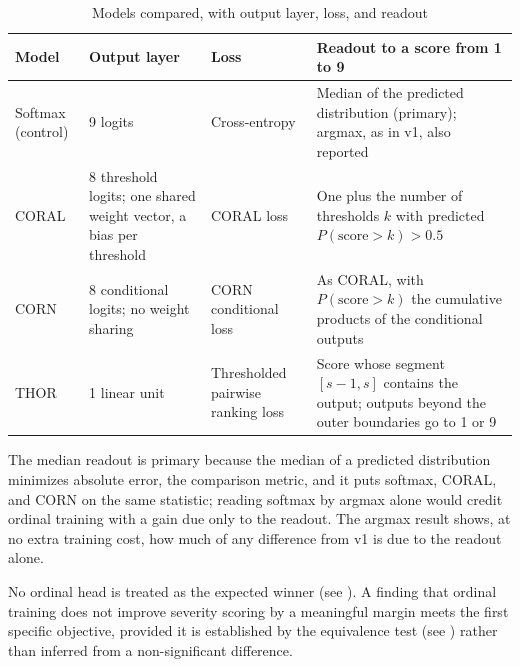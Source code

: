 \documentclass{icsthesis}
\newcommand{\secref}[1]{\textit{\nameref{#1}}}
\begin{document}
\begin{mainmatter}
					\begin{table}[htbp]
					\vspace{4ex}
					\centering
						\caption{Models compared, with output layer, loss, and readout}
						\label{tab:models}
						\singlespacing\footnotesize
						\begin{tabular}{p{2.3cm}p{3.6cm}p{3.1cm}p{4.5cm}}
						\hline
						\hline
						Model & Output layer & Loss & Readout to a score from 1 to 9 \\ \hline
						Softmax (control) & 9 logits & Cross-entropy & Median of the predicted distribution (primary);
						argmax, as in v1, also reported \\
						CORAL \citep{cao2020} & 8 threshold logits; one shared weight vector, a bias per threshold &
						CORAL loss & One plus the number of thresholds $k$ with predicted $P(\text{score} > k) > 0.5$ \\
						CORN \citep{shi2023corn} & 8 conditional logits; no weight sharing & CORN conditional loss & As
						CORAL, with $P(\text{score} > k)$ the cumulative products of the conditional outputs \\
						THOR \citep{fuchs2022} & 1 linear unit & Thresholded pairwise ranking loss & Score whose segment
						$[s-1, s]$ contains the output; outputs beyond the outer boundaries go to 1 or 9 \\ \hline\hline
						\end{tabular}
					\vspace{4ex}
					\end{table}

					The median readout is primary because the median of a predicted
					distribution minimizes absolute error, the comparison metric, and it
					puts softmax, CORAL, and CORN on the same statistic; reading softmax
					by argmax alone would credit ordinal training with a gain due only
					to the readout. The argmax result shows, at no extra training cost,
					how much of any difference from v1 is due to the readout alone.

					No ordinal head is treated as the expected winner (see
					\secref{sec:ordinal}). A finding that ordinal training does not
					improve severity scoring by a meaningful margin meets the first
					specific objective, provided it is established by the equivalence
					test (see \secref{sec:hypotheses}) rather than inferred from a
					non-significant difference.


\end{mainmatter}
\end{document}
